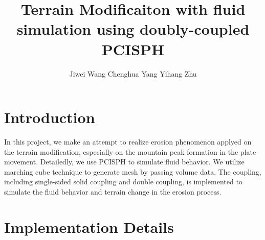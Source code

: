 \documentclass[acmtog]{acmart}
\title{Terrain Modificaiton with fluid simulation using doubly-coupled PCISPH}
\author{Jiwei Wang \quad Chenghua Yang \quad Yihang Zhu}
\begin{document}
\maketitle

\vspace*{2 ex}


\section{Introduction}
In this project, we make an attempt to realize erosion phenomenon applyed on the terrain modification, 
especially on the mountain peak formation in the plate movement. Detailedly, we use PCISPH to simulate fluid behavior.
We utilize marching cube technique to generate mesh by passing volume data. The coupling, including single-sided solid coupling and double coupling,
is implemented to simulate the fluid behavior and terrain change in the erosion process.

\section{Implementation Details}
\end{document}
